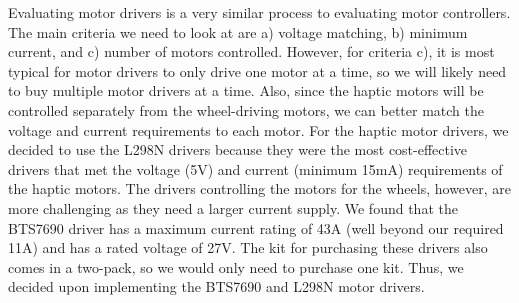 \noindent Evaluating motor drivers is a very similar process to evaluating motor controllers. The main criteria we need to look at are a) voltage matching, b) minimum current, and c) number of motors controlled. However, for criteria c), it is most typical for motor drivers to only drive one motor at a time, so we will likely need to buy multiple motor drivers at a time. Also, since the haptic motors will be controlled separately from the wheel-driving motors, we can better match the voltage and current requirements to each motor. For the haptic motor drivers, we decided to use the L298N drivers because they were the most cost-effective drivers that met the voltage (5V) and current (minimum 15mA) requirements of the haptic motors. The drivers controlling the motors for the wheels, however, are more challenging as they need a larger current supply. We found that the BTS7690 driver has a maximum current rating of 43A (well beyond our required 11A) and has a rated voltage of 27V. The kit for purchasing these drivers also comes in a two-pack, so we would only need to purchase one kit. Thus, we decided upon implementing the BTS7690 and L298N motor drivers. \\